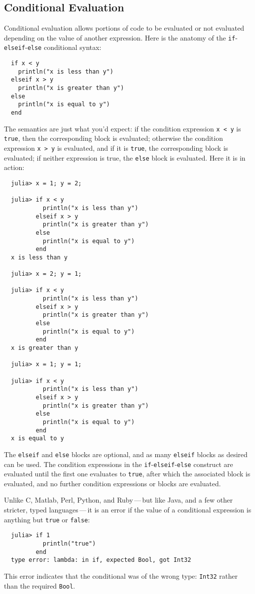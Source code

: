 \documentclass{article}
\renewcommand{\sec}[1]{\label{sec:#1}}
\begin{document}
\subsection{Conditional Evaluation}\sec{conditional-evaluation}

Conditional evaluation allows portions of code to be evaluated or not evaluated depending on the value of another expression.
Here is the anatomy of the \verb|if|-\verb|elseif|-\verb|else| conditional syntax:
\begin{verbatim}
  if x < y
    println("x is less than y")
  elseif x > y
    println("x is greater than y")
  else
    println("x is equal to y")
  end
\end{verbatim}
The semantics are just what you'd expect:
if the condition expression \verb|x < y| is \verb|true|, then the corresponding block is evaluated;
otherwise the condition expression \verb|x > y| is evaluated, and if it is \verb|true|, the corresponding block is evaluated;
if neither expression is true, the \verb|else| block is evaluated.
Here it is in action:
\begin{verbatim}
  julia> x = 1; y = 2;

  julia> if x < y
           println("x is less than y")
         elseif x > y
           println("x is greater than y")
         else
           println("x is equal to y")
         end
  x is less than y

  julia> x = 2; y = 1;

  julia> if x < y
           println("x is less than y")
         elseif x > y
           println("x is greater than y")
         else
           println("x is equal to y")
         end
  x is greater than y

  julia> x = 1; y = 1;

  julia> if x < y
           println("x is less than y")
         elseif x > y
           println("x is greater than y")
         else
           println("x is equal to y")
         end
  x is equal to y
\end{verbatim}
The \verb|elseif| and \verb|else| blocks are optional, and as many \verb|elseif| blocks as desired can be used.
The condition expressions in the \verb|if|-\verb|elseif|-\verb|else| construct are evaluated until the first one evaluates to \verb|true|, after which the associated block is evaluated, and no further condition expressions or blocks are evaluated.

Unlike C, Matlab, Perl, Python, and Ruby\,---\,but like Java, and a few other stricter, typed languages\,---\,it is an error if the value of a conditional expression is anything but \verb|true| or \verb|false|:
\begin{verbatim}
  julia> if 1
           println("true")
         end
  type error: lambda: in if, expected Bool, got Int32
\end{verbatim}
This error indicates that the conditional was of the wrong type:
\verb|Int32| rather than the required \verb|Bool|.
\end{document}
